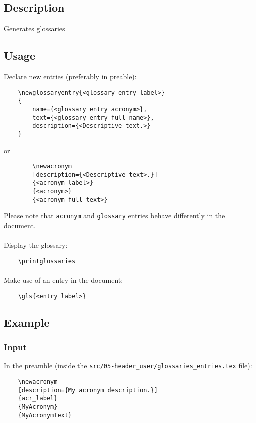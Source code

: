     \subsection{Description}
    Generates glossaries

    \subsection{Usage}

    Declare new entries (preferably in preable):
    \begin{lstlisting}
    \newglossaryentry{<glossary entry label>}
    {
        name={<glossary entry acronym>},
        text={<glossary entry full name>},
        description={<Descriptive text.>}
    }
    \end{lstlisting}

    or
    \begin{lstlisting}
        \newacronym
        [description={<Descriptive text>.}]
        {<acronym label>}
        {<acronym>}
        {<acronym full text>}
    \end{lstlisting}

    Please note that \texttt{acronym} and \texttt{glossary} entries behave
    differently in the document.



    \paragraph{}Display the glossary:
    \begin{lstlisting}
    \printglossaries
    \end{lstlisting}

    \paragraph{}Make use of an entry in the document:
    \begin{lstlisting}
    \gls{<entry label>}
    \end{lstlisting}


\subsection{Example}
\subsubsection{Input}
In the preamble (inside the \verb|src/05-header_user/glossaries_entries.tex|
file):
\begin{lstlisting}
    \newacronym
    [description={My acronym description.}]
    {acr_label}
    {MyAcronym}
    {MyAcronymText}
\end{lstlisting}


